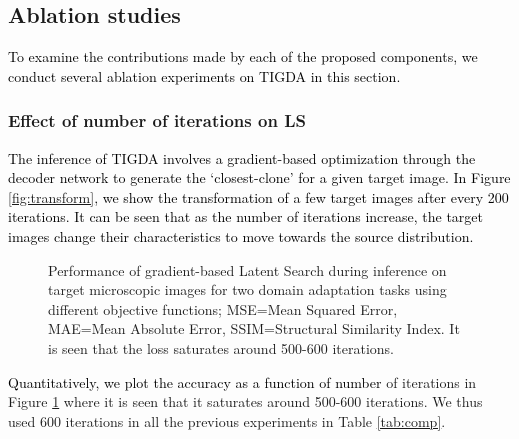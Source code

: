 \documentclass[journal,twoside,web]{IEEEtran}
\newcommand{\bb}{\textcolor{black}}
\begin{document}
\subsection{Ablation studies}
\bb{To examine the contributions made by each of the proposed components, we conduct several ablation experiments} \bb{on TIGDA in this section.} 
\subsubsection{Effect of number of iterations on LS}
\bb{The inference of TIGDA involves a gradient-based optimization through the decoder network  to generate the `closest-clone' for a given target image. In Figure \ref{fig:transform},  we show the transformation of a few target images after every 200 iterations. It can be seen that as the number of iterations increase, the target images change their characteristics to move towards the source distribution.}
\setlength{\textfloatsep}{0pt}
\begin{figure}[hbt!]
\hfill
    \hfill
{}
\caption{Performance of gradient-based Latent Search during inference on target microscopic images for two domain adaptation tasks using different objective functions; MSE=Mean Squared Error, MAE=Mean Absolute Error, SSIM=Structural Similarity Index. It is seen that the loss saturates around 500-600 iterations.}
\label{fig:lossacc}
\end{figure}
\bb{Quantitatively, we plot the accuracy as a function of number} of iterations in Figure \ref{fig:lossacc} where it is seen that it saturates around 500-600 iterations. We thus used 600 iterations in all the previous experiments in Table \ref{tab:comp}. 
\end{document}

